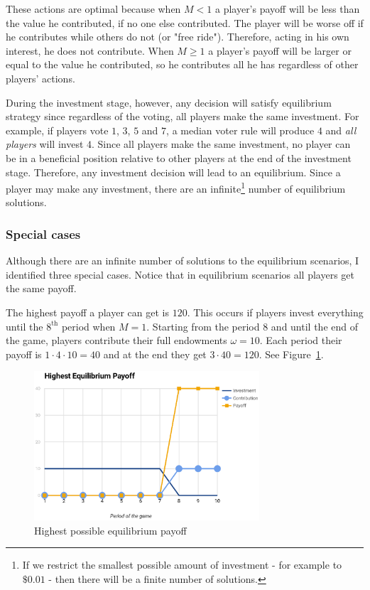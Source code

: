 			These actions are optimal because when $M< 1$ a player's payoff will be less than the value he contributed, if no one else contributed. The player will be worse off if he contributes while others do not (or "free ride"). Therefore, acting in his own interest, he does not contribute. When $M \ge 1$ a player's payoff will be larger or equal to the value he contributed, so he contributes all he has regardless of other players' actions.

			During the investment stage, however, any decision will satisfy equilibrium strategy since regardless of the voting, all players make the same investment. For example, if players vote $1$, $3$, $5$ and $7$, a median voter rule will produce $4$ and \emph{all players} will invest $4$. Since all players make the same investment, no player can be in a beneficial position relative to other players at the end of the investment stage. Therefore, any investment decision will lead to an equilibrium. Since a player may make any investment, there are an infinite\footnote{If we restrict the smallest possible amount of investment - for example to $\$0.01$ - then there will be a finite number of solutions.} number of equilibrium solutions.

		\subsubsection{Special cases}

			Although there are an infinite number of solutions to the equilibrium scenarios, I identified three special cases. Notice that in equilibrium scenarios all players get the same payoff.

			The highest payoff a player can get is $120$. This occurs if players invest everything until the $8^\text{th}$ period when $M = 1$. Starting from the period $8$ and until the end of the game, players contribute their full endowments $\omega = 10$. Each period their payoff is $1 \cdot 4 \cdot 10 = 40$ and at the end they get $3 \cdot 40 = 120$. See Figure~\ref{fig:nash-highest}.

			\begin{figure}
				\begin{center}
					\includegraphics[width=8.4cm]{resources/eps/nash-highest.eps}
					\caption{Highest possible equilibrium payoff} 
					\label{fig:nash-highest}
				\end{center}
			\end{figure}

